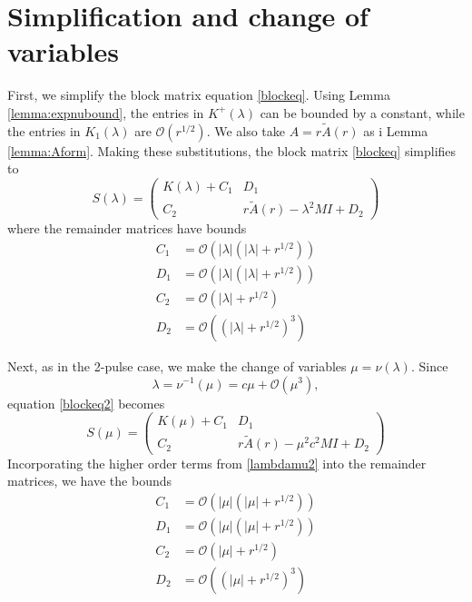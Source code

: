 \documentclass[thesis.tex]{subfiles}
\begin{document}
\section{Simplification and change of variables}

First, we simplify the block matrix equation \cref{blockeq}. Using Lemma \ref{lemma:expnubound}, the entries in $K^+(\lambda)$ can be bounded by a constant, while the entries in $K_1(\lambda)$ are $\mathcal{O}(r^{1/2})$. We also take $A = r \tilde{A}(r)$ as i Lemma \ref{lemma:Aform}. Making these substitutions, the block matrix \cref{blockeq} simplifies to 
\begin{equation}\label{blockeq2}
S(\lambda) = \begin{pmatrix}
K(\lambda) + C_1 & D_1 \\
C_2 & r \tilde{A}(r) - \lambda^2 M I + D_2
\end{pmatrix}
\end{equation}
where the remainder matrices have bounds
\begin{equation*}
\begin{aligned}
C_1 &= \mathcal{O}(|\lambda|(|\lambda| + r^{1/2})) \\
D_1 &= \mathcal{O}(|\lambda|(|\lambda| + r^{1/2})) \\
C_2 &= \mathcal{O}(|\lambda| + r^{1/2}) \\
D_2 &= \mathcal{O}((|\lambda| + r^{1/2})^3) 
\end{aligned}
\end{equation*}

Next, as in the 2-pulse case, we make the change of variables $\mu = \nu(\lambda)$. Since
\begin{equation}\label{lambdamu2}
\lambda = \nu^{-1}(\mu) = c \mu + \mathcal{O}(\mu^3),
\end{equation}
equation \cref{blockeq2} becomes
\begin{equation}\label{blockeq2}
S(\mu) = \begin{pmatrix}
K(\mu) + C_1 & D_1 \\
C_2 & r \tilde{A}(r) - \mu^2 c^2 M I + D_2
\end{pmatrix}
\end{equation}
Incorporating the higher order terms from \cref{lambdamu2} into the remainder matrices, we have the bounds
\begin{equation*}\label{remSbounds}
\begin{aligned}
C_1 &= \mathcal{O}(|\mu|(|\mu| + r^{1/2})) \\
D_1 &= \mathcal{O}(|\mu|(|\mu| + r^{1/2})) \\
C_2 &= \mathcal{O}(|\mu| + r^{1/2}) \\
D_2 &= \mathcal{O}((|\mu| + r^{1/2})^3) 
\end{aligned}
\end{equation*}
\end{document}
